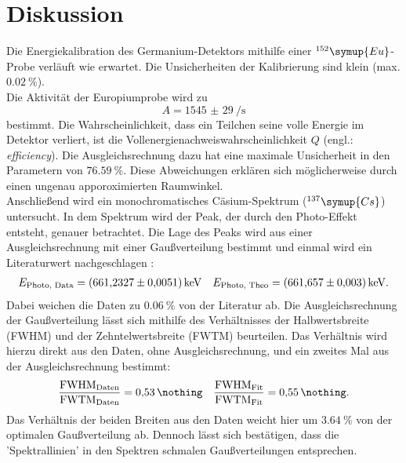 \section{Diskussion}
Die Energiekalibration des Germanium-Detektors mithilfe einer $^{152}\symup{Eu}$-Probe verläuft wie erwartet.
Die Unsicherheiten der Kalibrierung sind klein (max. $\SI{0.02}{\%}$).\\
Die Aktivität der Europiumprobe wird zu
\begin{equation*}
	A  = \SI{1545(29)}{\per \second}
\end{equation*}
bestimmt.
Die Wahrscheinlichkeit, dass ein Teilchen seine volle Energie im Detektor verliert, ist die Vollenergienachweiswahrscheinlichkeit $Q$ (engl.: \textit{efficiency}).
Die Ausgleichsrechnung dazu hat eine maximale Unsicherheit in den Parametern von $\SI{76.59}{\%}$.
Diese Abweichungen erklären sich möglicherweise durch einen ungenau apporoximierten Raumwinkel.\\

Anschließend wird ein monochromatisches Cäsium-Spektrum ($^{137}\symup{Cs}$) untersucht.
In dem Spektrum wird der Peak, der durch den Photo-Effekt entsteht, genauer betrachtet.
Die Lage des Peaks wird aus einer Ausgleichsrechnung mit einer Gaußverteilung bestimmt und einmal wird ein Literaturwert nachgeschlagen \cite{nucleide}:
\begin{align*}
E_{\text{Photo, Data}} = \SI{661.2327 (51)}{\kilo \electronvolt} && E_{\text{Photo, Theo}} = \SI{661.657 (3)}{\kilo \electronvolt}.
\end{align*}
Dabei weichen die Daten zu $\SI{0.06}{\%}$ von der Literatur ab.
Die Ausgleichsrechnung der Gaußverteilung lässt sich mithilfe des Verhältnisses der Halbwertsbreite (FWHM) und der Zehntelwertsbreite (FWTM) beurteilen.
Das Verhältnis wird hierzu direkt aus den Daten, ohne Ausgleichsrechnung, und ein zweites Mal aus der Ausgleichsrechnung bestimmt:
\begin{align*}
	\frac{ \text{FWHM}_{\text{Daten}} }{ \text{FWTM}_{\text{Daten}} }  = \SI{0.53}{\nothing} && 	\frac{ \text{FWHM}_{\text{Fit}} }{ \text{FWTM}_{\text{Fit}} } = \SI{0.55}{\nothing}. \\
\end{align*}
Das Verhältnis der beiden Breiten aus den Daten weicht hier um $\SI{3.64}{\%}$ von der optimalen Gaußverteilung ab.
Dennoch lässt sich bestätigen, dass die 'Spektrallinien' in den Spektren schmalen Gaußverteilungen entsprechen.\\

